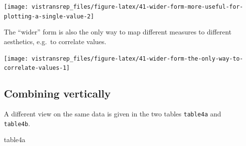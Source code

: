 \documentclass[]{book}
\newenvironment{Shaded}{}{}
\newcommand{\DataTypeTok}[1]{#1}
\newcommand{\KeywordTok}[1]{\textcolor[rgb]{0.00,0.00,1.00}{#1}}
\newcommand{\NormalTok}[1]{#1}
\newcommand{\OperatorTok}[1]{#1}
\newcommand{\StringTok}[1]{\textcolor[rgb]{0.00,0.50,0.50}{#1}}
\begin{document}
\begin{Shaded}
\end{Shaded}

\begin{flushright}\texttt{[image: vistransrep\_files/figure-latex/41-wider-form-more-useful-for-plotting-a-single-value-2]} \end{flushright}

The ``wider'' form is also the only way to map different measures to different aesthetics, e.g.~to correlate values.

\begin{Shaded}
\end{Shaded}

\begin{flushright}\texttt{[image: vistransrep\_files/figure-latex/41-wider-form-the-only-way-to-correlate-values-1]} \end{flushright}

\hypertarget{combining-vertically}{%
\subsection{Combining vertically}\label{combining-vertically}}

A different view on the same data is given in the two tables \texttt{table4a} and \texttt{table4b}.

\begin{Shaded}
\begin{Highlighting}[]
\NormalTok{table4a}
\end{Highlighting}
\end{Shaded}
\end{document}
